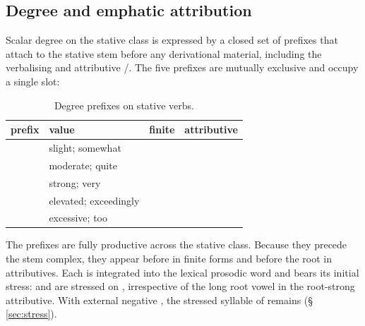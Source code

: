 \subsection{Degree and emphatic attribution}\label{sec:stative-degree}
Scalar degree on the stative class is expressed by a closed set of prefixes
that attach to the stative stem before any derivational material, including
the verbalising  and attributive /. The five prefixes are
mutually exclusive and occupy a single slot:

\begin{table}[ht]
  \footnotesize
  \caption{Degree prefixes on stative verbs.}\label{tab:degpfx}
  \begin{tabularx}{\textwidth}{l l L L}
    \toprule
    {\sc prefix} & {\sc value} & {\sc finite} & {\sc attributive} \\
    \midrule
      & slight; somewhat      &   &   \\
      & moderate; quite       &   &   \\
     & strong; very          &  &  \\
      & elevated; exceedingly &   &   \\
     & excessive; too        &  &  \\
    \bottomrule
  \end{tabularx}
\end{table}

\noindent The prefixes are fully productive across the stative class. Because
they precede the stem complex, they appear before  in finite forms
and before the root in attributives. Each is integrated into the lexical
prosodic word and bears its initial stress:  and
 are stressed on , irrespective of the long root
vowel in the root-strong attributive. With external negative , the stressed
syllable of  remains 
(§\,\ref{sec:stress}).

